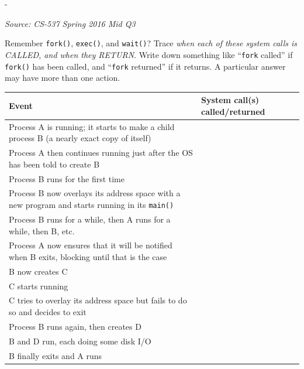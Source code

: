 \documentclass[11pt,a4paper]{article}
\makeatletter
\newcommand{\keepspace}[1]{\par\penalty-100\begingroup
  \setlength{\dimen@}{#1}\dimen@ii\pagegoal\advance\dimen@ii-\pagetotal
  \ifdim\dimen@>\dimen@ii\ifdim\dimen@ii>\z@\vfil\fi\break\fi\endgroup}
\newcounter{qn}[section]
\newenvironment{Qn}[4]{%
  \refstepcounter{qn}\keepspace{7\baselineskip}%
  \begin{tcolorbox}[qboxstyle, title={Q\thesection.\theqn\ \ [#1 \textbar\ #2]\ \ #4}]%
  {\footnotesize\color{g3}\textit{Source: #3}}\par\smallskip%
}{%
  \end{tcolorbox}%
}
\makeatother
\begin{document}
\begin{Qn}{Hard}{Lect 3}{CS-537 Spring 2016 Mid Q3}{\texttt{fork}/\texttt{exec}/\texttt{wait} call-and-return timeline}
Remember \texttt{fork()}, \texttt{exec()}, and \texttt{wait()}? Trace \emph{when each of these system calls is CALLED, and when they RETURN}. Write down something like ``\texttt{fork} called'' if \texttt{fork()} has been called, and ``\texttt{fork} returned'' if it returns. A particular answer may have more than one action.
\begin{center}
\begin{tabular}{p{}p{}}
\hline
Event & System call(s) called/returned \\
\hline
Process A is running; it starts to make a child process B
  (a nearly exact copy of itself) & \\
Process A then continues running just after the OS has been
  told to create B & \\
Process B runs for the first time & \\
Process B now overlays its address space with a new program
  and starts running in its \texttt{main()} & \\
Process B runs for a while, then A runs for a while, then B, etc. & \\
Process A now ensures that it will be notified when B exits,
  blocking until that is the case & \\
B now creates C & \\
C starts running & \\
C tries to overlay its address space but fails to do so
  and decides to exit & \\
Process B runs again, then creates D & \\
B and D run, each doing some disk I/O & \\
B finally exits and A runs & \\
\hline
\end{tabular}
\end{center}
\end{Qn}
\end{document}
